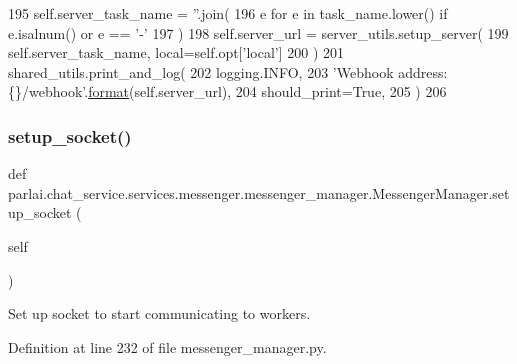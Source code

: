 \begin{DoxyCode}
195         self.server\_task\_name = \textcolor{stringliteral}{''}.join(
196             e \textcolor{keywordflow}{for} e \textcolor{keywordflow}{in} task\_name.lower() \textcolor{keywordflow}{if} e.isalnum() \textcolor{keywordflow}{or} e == \textcolor{stringliteral}{'-'}
197         )
198         self.server\_url = server\_utils.setup\_server(
199             self.server\_task\_name, local=self.opt[\textcolor{stringliteral}{'local'}]
200         )
201         shared\_utils.print\_and\_log(
202             logging.INFO,
203             \textcolor{stringliteral}{'Webhook address: \{\}/webhook'}.\hyperlink{namespaceparlai_1_1chat__service_1_1services_1_1messenger_1_1shared__utils_a32e2e2022b824fbaf80c747160b52a76}{format}(self.server\_url),
204             should\_print=\textcolor{keyword}{True},
205         )
206 
\end{DoxyCode}
\mbox{\label{classparlai_1_1chat__service_1_1services_1_1messenger_1_1messenger__manager_1_1MessengerManager_aa3762b7362346cdaaf1d1ad0d6372166}} 
\subsubsection{\texorpdfstring{setup\+\_\+socket()}{setup\_socket()}}
{\footnotesize\ttfamily def parlai.\+chat\+\_\+service.\+services.\+messenger.\+messenger\+\_\+manager.\+Messenger\+Manager.\+setup\+\_\+socket (\begin{DoxyParamCaption}\item[{}]{self }\end{DoxyParamCaption})}

\begin{DoxyVerb}Set up socket to start communicating to workers.
\end{DoxyVerb}
 

Definition at line 232 of file messenger\+\_\+manager.\+py.


